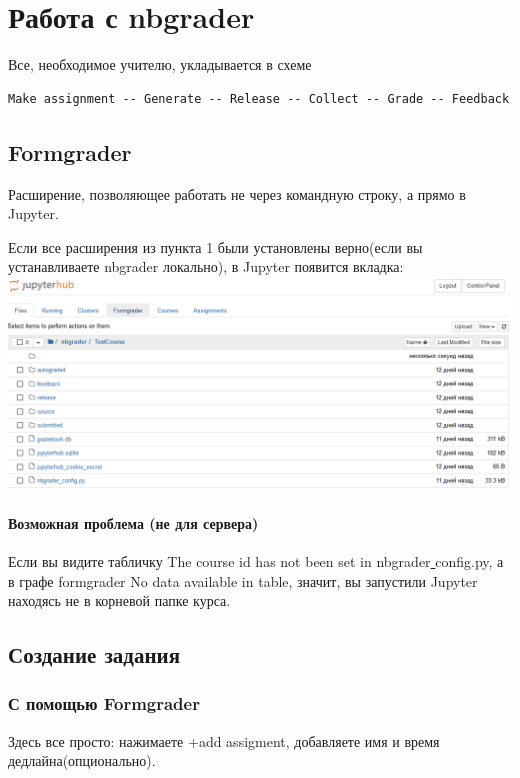 \documentclass[a4paper,12pt]{article}
\begin{document}
\section{Работа с nbgrader}

Все, необходимое учителю, укладывается в схеме
\begin{verbatim}
Make assignment -- Generate -- Release -- Collect -- Grade -- Feedback
\end{verbatim}
\subsection{Formgrader}

Расширение, позволяющее работать не через командную строку, а прямо в Jupyter. 

Если все расширения из пункта 1 были установлены верно(если вы устанавливаете nbgrader локально), в Jupyter появится вкладка:
\includegraphics[width=\textwidth]{formgrader_tab1}
\paragraph{Возможная проблема (не для сервера)}
Если вы видите табличку \grqq The course id has not been set in nbgrader\underline{ }config.py\grqq, а в графе formgrader \grqq No data available in table\grqq , значит, вы запустили Jupyter находясь не в корневой папке курса.
\subsection{Создание задания}
\subsubsection{С помощью Formgrader}

Здесь все просто: нажимаете +add assigment, добавляете имя и время дедлайна(опционально).
\end{document}
